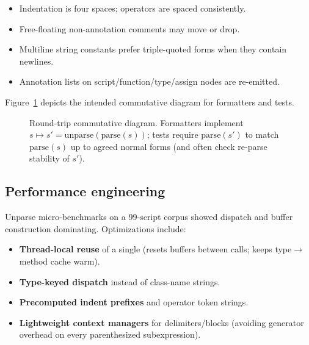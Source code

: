 \documentclass[11pt,a4paper]{article}
\begin{document}
\begin{itemize}[leftmargin=*]
  \item Indentation is four spaces; operators are spaced consistently.
  \item Free-floating non-annotation comments may move or drop.
  \item Multiline string constants prefer triple-quoted forms when they contain
    newlines.
  \item Annotation lists on script/function/type/assign nodes are re-emitted.
\end{itemize}

Figure~\ref{fig:roundtrip} depicts the intended commutative diagram for
formatters and tests.

\begin{figure}[t]
\centering
{}
\caption{Round-trip commutative diagram. Formatters implement
\(s \mapsto s' = \mathrm{unparse}(\mathrm{parse}(s))\); tests require
\(\mathrm{parse}(s')\) to match \(\mathrm{parse}(s)\) up to agreed normal forms
(and often check re-parse stability of \(s'\)).}
\label{fig:roundtrip}
\end{figure}

\subsection{Performance engineering}
Unparse micro-benchmarks on a 99-script corpus showed dispatch and buffer
construction dominating. Optimizations include:

\begin{itemize}[leftmargin=*]
  \item \textbf{Thread-local reuse} of a single  (resets
    buffers between calls; keeps type\(\to\)method cache warm).
  \item \textbf{Type-keyed dispatch} instead of class-name strings.
  \item \textbf{Precomputed indent prefixes} and operator token strings.
  \item \textbf{Lightweight context managers} for delimiters/blocks (avoiding
     generator overhead on every parenthesized subexpression).
\end{itemize}
\end{document}
